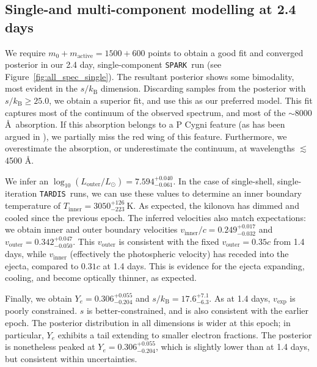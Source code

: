 \documentclass[twocolumn,twocolappendix]{aastex63}
\def\SPARK{\texttt{SPARK}}
\def\TARDIS{\texttt{TARDIS}}
\begin{document}
\subsection{Single-and multi-component modelling at 2.4 days}\label{ssc:2.4}

We require $m_0 + m_{\mathrm{active}} = 1500 + 600$ points to obtain a good fit and converged posterior in our 2.4 day, single-component \SPARK~run (see Figure~\ref{fig:all_spec_single}). The resultant posterior shows some bimodality, most evident in the $s/k_{\mathrm{B}}$ dimension. Discarding samples from the posterior with $s/k_{\mathrm{B}} \geqslant 25.0$, we obtain a superior fit, and use this as our preferred model. This fit captures most of the continuum of the observed spectrum, and most of the $\sim$8000 \AA~absorption. If this absorption belongs to a P Cygni feature (as has been argued in \citealt{watson19, sneppen23}), we partially miss the red wing of this feature. Furthermore, we overestimate the absorption, or underestimate the continuum, at wavelengths $\lesssim$4500 \AA. 

We infer an $\log_{10} (L_{\mathrm{outer}}/L_{\odot}) = 7.594^{+0.040}_{-0.061}$. In the case of single-shell, single-iteration \TARDIS~runs, we can use these values to determine an inner boundary temperature of $T_{\mathrm{inner}} = 3050^{+126}_{-223}~\mathrm{K}$. As expected, the kilonova has dimmed and cooled since the previous epoch. The inferred velocities also match expectations: we obtain inner and outer boundary velocities $v_{\mathrm{inner}}/c = 0.249^{+0.017}_{-0.032}$ and $v_{\mathrm{outer}} = 0.342^{+0.047}_{-0.050}$. This $v_{\mathrm{outer}}$ is consistent with the fixed $v_{\mathrm{outer}} = 0.35c$ from 1.4 days, while $v_{\mathrm{inner}}$ (effectively the photospheric velocity) has receded into the ejecta, compared to $0.31c$ at 1.4 days. This is evidence for the ejecta expanding, cooling, and become optically thinner, as expected.

Finally, we obtain $Y_e = 0.306^{+0.055}_{-0.204}$ and $s/k_{\mathrm{B}} = 17.6^{+7.1}_{-6.3}$. As at 1.4 days, $v_{\mathrm{exp}}$ is poorly constrained. $s$ is better-constrained, and is also consistent with the earlier epoch. The posterior distribution in all dimensions is wider at this epoch; in particular, $Y_e$ exhibits a tail extending to smaller electron fractions. The posterior is nonetheless peaked at $Y_e = 0.306^{+0.055}_{-0.204}$, which is slightly lower than at 1.4 days, but consistent within uncertainties. 
\end{document}
